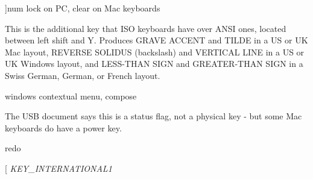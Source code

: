 \begin{Desc}
\begin{description}
{}]num lock on PC, clear on Mac keyboards \item[{\em 
\hypertarget{classphys_1_1MetaCode_a3e501cbb5bf0f6f1fdb7211465bda8d8a858a1c9e3bd7b047e05220da9b0a3966}{
KEY\_\-NONUSBACKSLASH}
\label{da/dc9/classphys_1_1MetaCode_a3e501cbb5bf0f6f1fdb7211465bda8d8a858a1c9e3bd7b047e05220da9b0a3966}
}]This is the additional key that ISO keyboards have over ANSI ones, located between left shift and Y. Produces GRAVE ACCENT and TILDE in a US or UK Mac layout, REVERSE SOLIDUS (backslash) and VERTICAL LINE in a US or UK Windows layout, and LESS-\/THAN SIGN and GREATER-\/THAN SIGN in a Swiss German, German, or French layout. \item[{\em 
\hypertarget{classphys_1_1MetaCode_a3e501cbb5bf0f6f1fdb7211465bda8d8a2e2aa499dcbb30b92204e9895049ad91}{
KEY\_\-APPLICATION}
\label{da/dc9/classphys_1_1MetaCode_a3e501cbb5bf0f6f1fdb7211465bda8d8a2e2aa499dcbb30b92204e9895049ad91}
}]windows contextual menu, compose \item[{\em 
\hypertarget{classphys_1_1MetaCode_a3e501cbb5bf0f6f1fdb7211465bda8d8a08a2d04e3a40d746b81913e92a25a038}{
KEY\_\-POWER}
\label{da/dc9/classphys_1_1MetaCode_a3e501cbb5bf0f6f1fdb7211465bda8d8a08a2d04e3a40d746b81913e92a25a038}
}]The USB document says this is a status flag, not a physical key -\/ but some Mac keyboards do have a power key. \item[{\em 
\hypertarget{classphys_1_1MetaCode_a3e501cbb5bf0f6f1fdb7211465bda8d8a7e4a4d24f9b7d3cb3695c9419c5aed4a}{
KEY\_\-AGAIN}
\label{da/dc9/classphys_1_1MetaCode_a3e501cbb5bf0f6f1fdb7211465bda8d8a7e4a4d24f9b7d3cb3695c9419c5aed4a}
}]redo \item[{\em 
\hypertarget{classphys_1_1MetaCode_a3e501cbb5bf0f6f1fdb7211465bda8d8a47fe3fc087358b7166c1f1ce71effdc9}{
KEY\_\-INTERNATIONAL1}
\label{da/dc9/classphys_1_1MetaCode_a3e501cbb5bf0f6f1fdb7211465bda8d8a47fe3fc087358b7166c1f1ce71effdc9}
}
\end{description}
\end{Desc}
